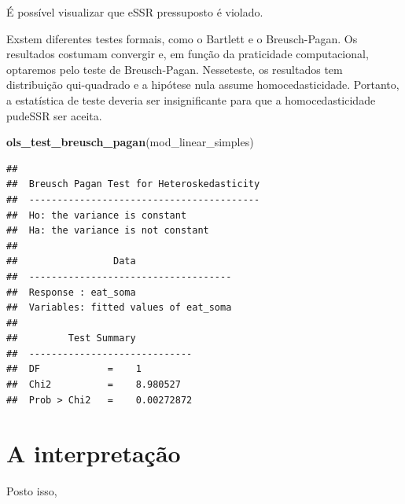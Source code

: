 \documentclass[
]{book}
\newenvironment{Shaded}{\begin{snugshade}}{\end{snugshade}}
\newcommand{\KeywordTok}[1]{\textcolor[rgb]{0.13,0.29,0.53}{\textbf{#1}}}
\newcommand{\NormalTok}[1]{#1}
\begin{document}
É possível visualizar que eSSR pressuposto é violado.

Exstem diferentes testes formais, como o Bartlett e o Breusch-Pagan. Os resultados costumam convergir e, em função da praticidade computacional, optaremos pelo teste de Breusch-Pagan. Nesseteste, os resultados tem distribuição qui-quadrado e a hipótese nula assume homocedasticidade. Portanto, a estatística de teste deveria ser insignificante para que a homocedasticidade pudeSSR ser aceita.

\begin{Shaded}
\begin{Highlighting}[]
\KeywordTok{ols_test_breusch_pagan}\NormalTok{(mod_linear_simples)}
\end{Highlighting}
\end{Shaded}

\begin{verbatim}
## 
##  Breusch Pagan Test for Heteroskedasticity
##  -----------------------------------------
##  Ho: the variance is constant            
##  Ha: the variance is not constant        
## 
##                 Data                 
##  ------------------------------------
##  Response : eat_soma 
##  Variables: fitted values of eat_soma 
## 
##         Test Summary          
##  -----------------------------
##  DF            =    1 
##  Chi2          =    8.980527 
##  Prob > Chi2   =    0.00272872
\end{verbatim}

\hypertarget{a-interpretauxe7uxe3o}{%
\section{A interpretação}\label{a-interpretauxe7uxe3o}}

Posto isso,

  
\end{document}
